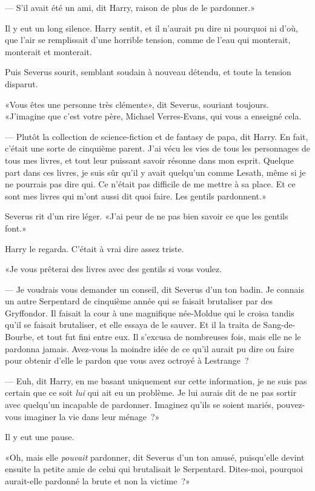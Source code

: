 --- S'il avait été un ami, dit Harry, raison de plus de le pardonner.»

Il y eut un long silence. Harry sentit, et il n'aurait pu dire ni pourquoi ni d'où, que l'air se remplissait d'une horrible tension, comme de l'eau qui monterait, monterait et monterait.

Puis Severus sourit, semblant soudain à nouveau détendu, et toute la tension disparut.

«Vous êtes une personne très clémente», dit Severus, souriant toujours. «J'imagine que c'est votre père, Michael Verres-Evans, qui vous a enseigné cela.

--- Plutôt la collection de science-fiction et de fantasy de papa, dit Harry. En fait, c'était une sorte de cinquième parent. J'ai vécu les vies de tous les personnages de tous mes livres, et tout leur puissant savoir résonne dans mon esprit. Quelque part dans ces livres, je suis sûr qu'il y avait quelqu'un comme Lesath, même si je ne pourrais pas dire qui. Ce n'était pas difficile de me mettre à sa place. Et ce sont mes livres qui m'ont aussi dit quoi faire. Les gentils pardonnent.»

Severus rit d'un rire léger. «J'ai peur de ne pas bien savoir ce que les gentils font.»

Harry le regarda. C'était à vrai dire assez triste.

«Je vous prêterai des livres avec des gentils si vous voulez.

--- Je voudrais vous demander un conseil, dit Severus d'un ton badin. Je connais un autre Serpentard de cinquième année qui se faisait brutaliser par des Gryffondor. Il faisait la cour à une magnifique née-Moldue qui le croisa tandis qu'il se faisait brutaliser, et elle essaya de le sauver. Et il la traita de Sang-de-Bourbe, et tout fut fini entre eux. Il s'excusa de nombreuses fois, mais elle ne le pardonna jamais. Avez-vous la moindre idée de ce qu'il aurait pu dire ou faire pour obtenir d'elle le pardon que vous avez octroyé à Lestrange~?

--- Euh, dit Harry, en me basant uniquement sur cette information, je ne suis pas certain que ce soit \emph{lui} qui ait eu un problème. Je lui aurais dit de ne pas sortir avec quelqu'un incapable de pardonner. Imaginez qu'ils se soient mariés, pouvez-vous imaginer la vie dans leur ménage~?»

Il y eut une pause.

«Oh, mais elle \emph{pouvait} pardonner, dit Severus d'un ton amusé, puisqu'elle devint ensuite la petite amie de celui qui brutalisait le Serpentard. Dites-moi, pourquoi aurait-elle pardonné la brute et non la victime~?»


